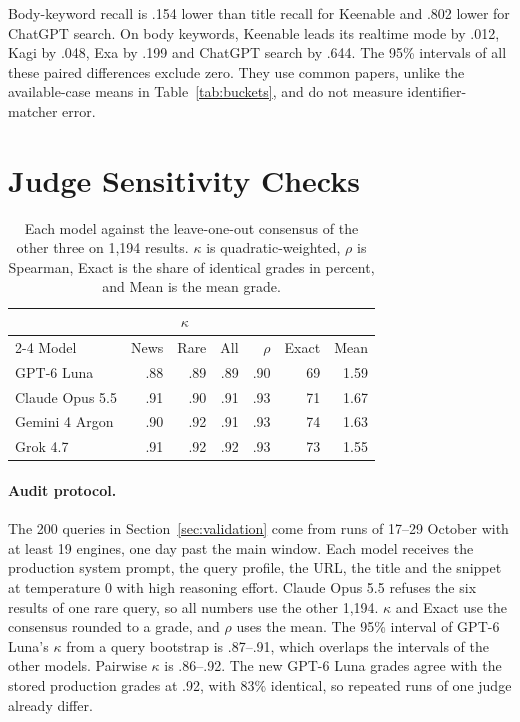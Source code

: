 \documentclass[11pt]{article}
\begin{document}
Body-keyword recall is .154 lower than title recall for Keenable and .802
lower for ChatGPT search. On body keywords, Keenable leads its realtime
mode by .012, Kagi by .048, Exa by .199 and ChatGPT search by .644. The
95\% intervals of all these paired differences exclude zero. They use
common papers, unlike the available-case means in
Table~\ref{tab:buckets}, and do not measure identifier-matcher error.

\section{Judge Sensitivity Checks}
\label{app:validation}

\begin{table}[ht]
\centering\footnotesize
\setlength{\tabcolsep}{3pt}
\begin{tabular}{@{}lrrrrrr@{}}
\toprule
 & \multicolumn{3}{c}{$\kappa$} & & & \\
\cmidrule(lr){2-4}
Model & News & Rare & All & $\rho$ & Exact & Mean \\
\midrule
GPT-6 Luna & .88 & .89 & .89 & .90 & 69 & 1.59 \\
Claude Opus 5.5 & .91 & .90 & .91 & .93 & 71 & 1.67 \\
Gemini 4 Argon & .90 & .92 & .91 & .93 & 74 & 1.63 \\
Grok 4.7 & .91 & .92 & .92 & .93 & 73 & 1.55 \\
\bottomrule
\end{tabular}
\caption{Each model against the leave-one-out consensus of the other
three on 1,194 results. $\kappa$ is quadratic-weighted, $\rho$ is
Spearman, Exact is the share of identical grades in percent, and Mean is
the mean grade.}
\label{tab:raters}
\end{table}

\paragraph{Audit protocol.}
The 200 queries in Section~\ref{sec:validation} come from runs of 17--29
October with at least 19 engines, one day past the main window. Each
model receives the production system prompt, the query profile, the URL,
the title and the snippet at temperature 0 with high reasoning effort.
Claude Opus 5.5 refuses the six results of one rare query, so all
numbers use the other 1,194. $\kappa$ and Exact use the consensus rounded
to a grade, and $\rho$ uses the mean. The 95\% interval of GPT-6 Luna's
$\kappa$ from a query bootstrap is .87--.91, which overlaps the
intervals of the other models. Pairwise $\kappa$ is .86--.92. The new
GPT-6 Luna grades agree with the stored production grades at .92, with
83\% identical, so repeated runs of one judge already differ.
\end{document}
